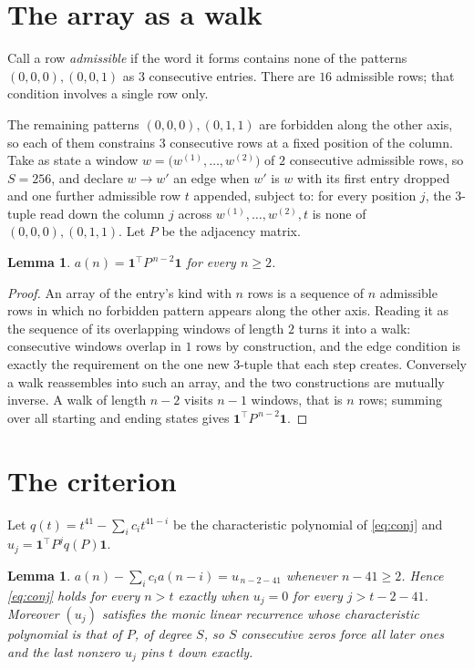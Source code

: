 \documentclass[11pt,a4paper]{article}
\theoremstyle{plain}
\newtheorem{lemma}[theorem]{Lemma}
\theoremstyle{definition}
\begin{document}
\section{The array as a walk}

Call a row \emph{admissible} if the word it forms contains none of the patterns
$(0,0,0), (0,0,1)$ as $3$ consecutive entries. There are $16$ admissible rows; that condition
involves a single row only.

The remaining patterns $(0,0,0), (0,1,1)$ are forbidden along the other axis, so each of them
constrains $3$ consecutive rows at a fixed position of the column. Take as state a
window $w=\bigl(w^{(1)},\dots,w^{(2)}\bigr)$ of $2$ consecutive admissible
rows, so $S=256$, and declare $w\to w'$ an edge when $w'$ is $w$ with its first entry
dropped and one further admissible row $t$ appended, subject to: for every position
$j$, the $3$-tuple read down the column $j$ across $w^{(1)},\dots,w^{(2)},t$
is none of $(0,0,0), (0,1,1)$. Let $P$ be the adjacency matrix.

\begin{lemma}\label{lem:walk}
$a(n)=\mathbf{1}^{\!\top}P^{\,n-2}\mathbf{1}$ for every $n\ge2$.
\end{lemma}

\begin{proof}
An array of the entry's kind with $n$ rows is a sequence of $n$ admissible rows in
which no forbidden pattern appears along the other axis. Reading it as the sequence of its
overlapping windows of length $2$ turns it into a walk: consecutive windows overlap in
$1$ rows by construction, and the edge condition is exactly the requirement on the one
new $3$-tuple that each step creates. Conversely a walk reassembles into such an array,
and the two constructions are mutually inverse. A walk of length $n-2$ visits $n-1$
windows, that is $n$ rows; summing over all starting and ending states gives
$\mathbf{1}^{\!\top}P^{\,n-2}\mathbf{1}$.
\end{proof}

\section{The criterion}

Let $q(t)=t^{41}-\sum_i c_i t^{41-i}$ be the characteristic polynomial of
\eqref{eq:conj} and $u_j=\mathbf{1}^{\!\top}P^{j}q(P)\mathbf{1}$.

\begin{lemma}\label{lem:crit}
$a(n)-\sum_i c_i a(n-i)=u_{\,n-2-41}$ whenever $n-41\ge2$. Hence
\eqref{eq:conj} holds for every $n>t$ exactly when $u_j=0$ for every
$j>t-2-41$. Moreover $(u_j)$ satisfies the monic linear recurrence whose
characteristic polynomial is that of $P$, of degree $S$, so $S$ consecutive zeros force all
later ones and the last nonzero $u_j$ pins $t$ down exactly.
\end{lemma}
\end{document}
